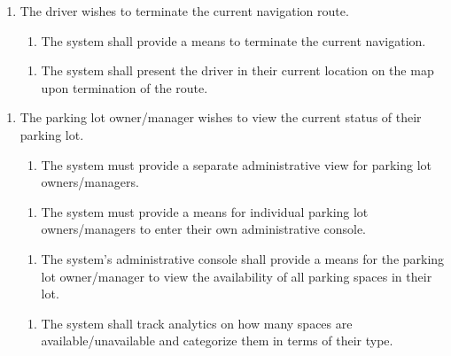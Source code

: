 \documentclass[12pt,letterpaper]{article}
\newcounter{businesseventnum}
\newcounter{funcreqnum}
\begin{document}
\begin{enumerate}[{BE}\thebusinesseventnum.] 
\item The driver wishes to terminate the current navigation route.
\begin{enumerate}[{FR}\thefuncreqnum.] 
    \item The system shall provide a means to terminate the current navigation.
\end{enumerate}
\begin{enumerate}[{FR}\thefuncreqnum.] 
    \item The system shall present the driver in their current location on the
    map upon termination of the route.
\end{enumerate}
\end{enumerate}

\begin{enumerate}[{BE}\thebusinesseventnum.] 
\item The parking lot owner/manager wishes to view the current status of their
parking lot.
\begin{enumerate}[{FR}\thefuncreqnum.] 
    \item The system must provide a separate administrative view for parking lot
    owners/managers.
\end{enumerate}
\begin{enumerate}[{FR}\thefuncreqnum.] 
    \item The system must provide a means for individual parking lot
    owners/managers to enter their own administrative console.
\end{enumerate}
\begin{enumerate}[{FR}\thefuncreqnum.] 
    \item The system's administrative console shall provide a means for the
    parking lot owner/manager to view the availability of all parking spaces in
    their lot.
\end{enumerate}
\begin{enumerate}[{FR}\thefuncreqnum.] 
    \item The system shall track analytics on how many spaces are
    available/unavailable and categorize them in terms of their type.
\end{enumerate}
\end{enumerate}
\end{document}
